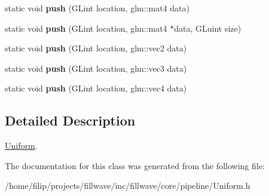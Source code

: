 \begin{DoxyCompactItemize}
static void {\bfseries push} (G\+Lint location, glm\+::mat4 data)
\item 
\mbox{\label{classflw_1_1flc_1_1Uniform_a08d7fe5519d1203c4ec64de114e7284f}} 
static void {\bfseries push} (G\+Lint location, glm\+::mat4 $\ast$data, G\+Luint size)
\item 
\mbox{\label{classflw_1_1flc_1_1Uniform_a9dec0fc3fbb3d930b6d4f93255c1d869}} 
static void {\bfseries push} (G\+Lint location, glm\+::vec2 data)
\item 
\mbox{\label{classflw_1_1flc_1_1Uniform_af00fb6f4514437ce0c76595a5fbba398}} 
static void {\bfseries push} (G\+Lint location, glm\+::vec3 data)
\item 
\mbox{\label{classflw_1_1flc_1_1Uniform_ace5d45016093017303f4db94746cdebc}} 
static void {\bfseries push} (G\+Lint location, glm\+::vec4 data)
\end{DoxyCompactItemize}


\subsection{Detailed Description}
\hyperlink{classflw_1_1flc_1_1Uniform}{Uniform}. 

The documentation for this class was generated from the following file\+:\begin{DoxyCompactItemize}
\item 
/home/filip/projects/fillwave/inc/fillwave/core/pipeline/Uniform.\+h\end{DoxyCompactItemize}
